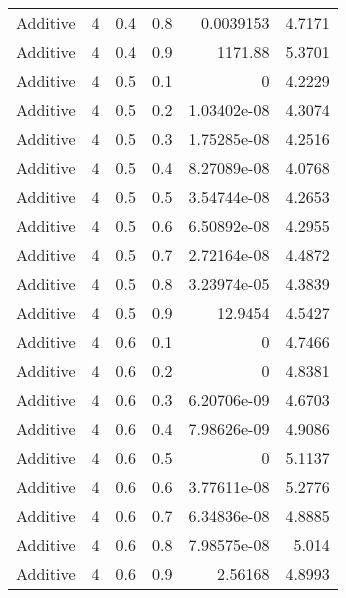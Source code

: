 \documentclass{article}
\begin{document}
\begin{longtable}[H]{lrrrrr}
 Additive       &       4 &   0.4 &            0.8 &      0.0039153   &          4.7171 \\
 Additive       &       4 &   0.4 &            0.9 &   1171.88        &          5.3701 \\
 Additive       &       4 &   0.5 &            0.1 &      0           &          4.2229 \\
 Additive       &       4 &   0.5 &            0.2 &      1.03402e-08 &          4.3074 \\
 Additive       &       4 &   0.5 &            0.3 &      1.75285e-08 &          4.2516 \\
 Additive       &       4 &   0.5 &            0.4 &      8.27089e-08 &          4.0768 \\
 Additive       &       4 &   0.5 &            0.5 &      3.54744e-08 &          4.2653 \\
 Additive       &       4 &   0.5 &            0.6 &      6.50892e-08 &          4.2955 \\
 Additive       &       4 &   0.5 &            0.7 &      2.72164e-08 &          4.4872 \\
 Additive       &       4 &   0.5 &            0.8 &      3.23974e-05 &          4.3839 \\
 Additive       &       4 &   0.5 &            0.9 &     12.9454      &          4.5427 \\
 Additive       &       4 &   0.6 &            0.1 &      0           &          4.7466 \\
 Additive       &       4 &   0.6 &            0.2 &      0           &          4.8381 \\
 Additive       &       4 &   0.6 &            0.3 &      6.20706e-09 &          4.6703 \\
 Additive       &       4 &   0.6 &            0.4 &      7.98626e-09 &          4.9086 \\
 Additive       &       4 &   0.6 &            0.5 &      0           &          5.1137 \\
 Additive       &       4 &   0.6 &            0.6 &      3.77611e-08 &          5.2776 \\
 Additive       &       4 &   0.6 &            0.7 &      6.34836e-08 &          4.8885 \\
 Additive       &       4 &   0.6 &            0.8 &      7.98575e-08 &          5.014  \\
 Additive       &       4 &   0.6 &            0.9 &      2.56168     &          4.8993 \\

\end{longtable}
\end{document}
